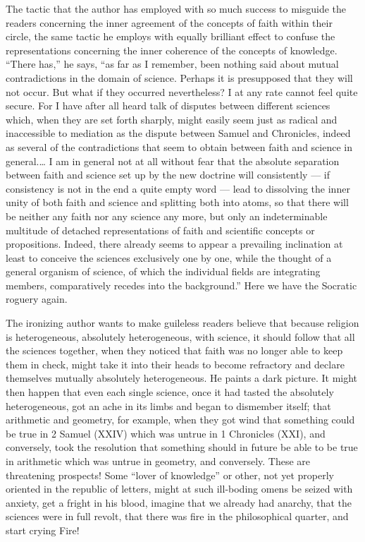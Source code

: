 \documentclass[12pt]{book}
\newcommand{\opage}[1]{\marginnote{\footnotesize\textit{[#1]}}}
\begin{document}
The tactic that the author has employed with so much success to misguide
the readers concerning the inner agreement of the concepts of faith within
their circle, the same tactic he employs with equally brilliant effect to
confuse the representations concerning the inner coherence of the concepts
of knowledge. ``There has,'' he says, ``as far as I remember, been nothing
said about mutual contradictions in the domain of science. Perhaps it is
presupposed that they will not occur. But what if they occurred
nevertheless? I at any rate cannot feel quite secure. For I
have after all heard talk of disputes between different sciences which,
when they are set forth sharply, might easily seem just as radical and
inaccessible to mediation as the dispute between Samuel and Chronicles,
indeed as several of the contradictions that seem to obtain between faith
and science in general.\ldots{} I am in general not at all without fear
that the absolute separation between faith and science set up by the new
doctrine will consistently --- if consistency is not in the end a quite
empty word --- lead to dissolving the inner unity of both faith and
science and splitting both into atoms, so that there will be neither any
faith nor any science any more, but only an indeterminable multitude of
detached representations of faith and scientific concepts or propositions.
Indeed, there already seems to appear a prevailing inclination at least to
conceive the sciences exclusively one by one, while the thought of a
general organism of science, of which the individual fields are
integrating members,
\opage{317}\setcounter{footnote}{0}%
comparatively recedes into the background.'' Here we have the Socratic
roguery again.

The ironizing author wants to make guileless readers believe that because
religion is heterogeneous, absolutely heterogeneous, with science, it
should follow that all the sciences together, when they noticed that
faith was no longer able to keep them in check, might take it into their
heads to become refractory and declare themselves mutually absolutely
heterogeneous. He paints a dark picture. It might then happen that even
each single science, once it had tasted the absolutely heterogeneous, got
an ache in its limbs and began to dismember itself; that arithmetic and
geometry, for example, when they got wind that something could be true in
2 Samuel (XXIV) which was untrue in 1 Chronicles (XXI), and conversely,
took the resolution that something should in future be able to be true in
arithmetic which was untrue in geometry, and conversely. These are
threatening prospects! Some ``lover of knowledge'' or other, not yet
properly oriented in the republic of letters, might at such ill-boding
omens be seized with anxiety, get a fright in his blood, imagine that we
already had anarchy, that the sciences were in full revolt, that there was
fire in the philosophical quarter, and start crying Fire!
\end{document}
